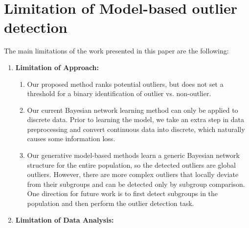 {\section{Limitation of Model-based outlier detection} 

The main limitations of the work presented in this paper are the following:
\begin{enumerate}
	\item \textbf{Limitation of Approach:} 
	\begin{enumerate}\item Our proposed method ranks potential outliers, but does not set a threshold for a binary identification of outlier vs. non-outlier.
		\item Our current Bayesian network learning method can only be applied to discrete data. Prior to learning the model, we take an extra step in data preprocessing and convert continuous data into discrete, which naturally causes some information loss. \item Our generative model-based methods learn a generic Bayesian network structure for the entire population, so the detected outliers are global outliers. However, there are  more complex outliers that locally deviate from their subgroups and can be detected only by subgroup comparison. One direction for future work is to first detect subgroups in the population and then perform the outlier detection task.
	\end{enumerate}
	\item \textbf{Limitation of Data Analysis: }
	

\end{enumerate}}
